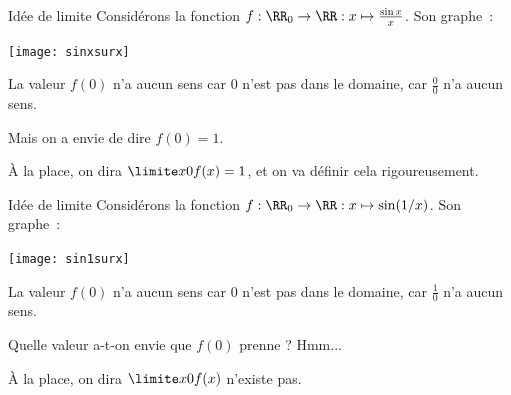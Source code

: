 \begin{frame}{Idée de limite}%
  Considérons la fonction \(f: \RR_0 \to \RR : x \mapsto \frac{\sin x}{x}\). \pause Son graphe~:
  \begin{center}
    \texttt{[image: sinxsurx]}
  \end{center}\pause
  La valeur \(f(0)\) n'a aucun sens car \(0\) n'est pas dans le domaine, car \(\frac{0}{0}\) n'a aucun sens.

  \pause Mais on a envie de dire \(f(0) = 1\).

  \pause À la place, on dira \(\limite x 0 f(x) = 1\), et on va définir cela rigoureusement.
\end{frame}

\begin{frame}{Idée de limite}%
  Considérons la fonction \(f: \RR_0 \to \RR : x \mapsto \sin(1/x)\). \pause Son graphe~:
  \begin{center}
    \texttt{[image: sin1surx]}
  \end{center}\pause
  La valeur \(f(0)\) n'a aucun sens car \(0\) n'est pas dans le domaine, car \(\frac{1}{0}\) n'a aucun sens.

  \pause Quelle valeur a-t-on envie que \(f(0)\) prenne ? Hmm...

  \pause À la place, on dira \(\limite x 0 f(x)\) n'existe pas.
\end{frame}
  






